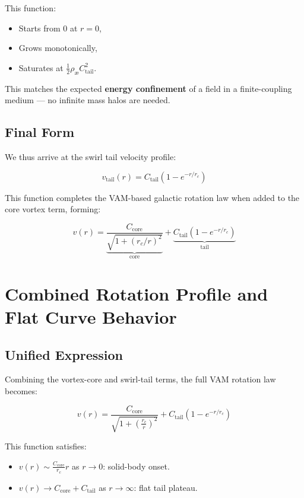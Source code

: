 \documentclass[12pt]{article}
\begin{document}
This function:
\begin{itemize}
    \item Starts from 0 at \( r=0 \),
    \item Grows monotonically,
    \item Saturates at \( \frac{1}{2} \rho_{\text{\ae}} C_{\text{tail}}^2 \).
\end{itemize}

This matches the expected \textbf{energy confinement} of a field in a finite-coupling medium — no infinite mass halos are needed.

\subsection{Final Form}

We thus arrive at the swirl tail velocity profile:

\begin{equation}
    \boxed{
    v_\text{tail}(r) = C_{\text{tail}} \left(1 - e^{-r/r_c} \right)
    }
\end{equation}

This function completes the VAM-based galactic rotation law when added to the core vortex term, forming:

\[
v(r) = \underbrace{ \frac{C_{\text{core}}}{\sqrt{1 + (r_c/r)^2}} }_{\text{core}} + \underbrace{ C_{\text{tail}} (1 - e^{-r/r_c}) }_{\text{tail}}
\]

\section{Combined Rotation Profile and Flat Curve Behavior}
\label{appendix:combined-vam-profile}

\subsection{Unified Expression}

Combining the vortex-core and swirl-tail terms, the full VAM rotation law becomes:

\begin{equation}
    \boxed{
    v(r) = \frac{C_{\text{core}}}{\sqrt{1 + \left( \frac{r_c}{r} \right)^2}} + C_{\text{tail}} \left(1 - e^{-r/r_c} \right)
    }
    \label{eq:full_vam_profile}
\end{equation}

This function satisfies:
\begin{itemize}
    \item \( v(r) \sim \frac{C_{\text{core}}}{r_c} r \) as \( r \to 0 \): solid-body onset.
    \item \( v(r) \to C_{\text{core}} + C_{\text{tail}} \) as \( r \to \infty \): flat tail plateau.
\end{itemize}
\end{document}
